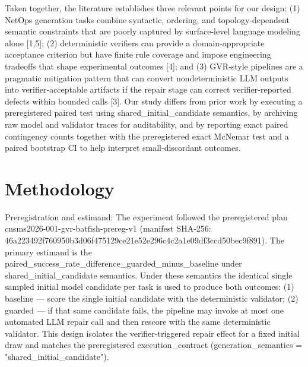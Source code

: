 \documentclass[conference]{IEEEtran}
\begin{document}
Taken together, the literature establishes three relevant points for our design: (1) NetOps generation tasks combine syntactic, ordering, and topology‑dependent semantic constraints that are poorly captured by surface‑level language modeling alone [1,5]; (2) deterministic verifiers can provide a domain‑appropriate acceptance criterion but have finite rule coverage and impose engineering tradeoffs that shape experimental outcomes [4]; and (3) GVR‑style pipelines are a pragmatic mitigation pattern that can convert nondeterministic LLM outputs into verifier‑acceptable artifacts if the repair stage can correct verifier‑reported defects within bounded calls [3]. Our study differs from prior work by executing a preregistered paired test using shared\_initial\_candidate semantics, by archiving raw model and validator traces for auditability, and by reporting exact paired contingency counts together with the preregistered exact McNemar test and a paired bootstrap CI to help interpret small‑discordant outcomes.

\section{Methodology}
Preregistration and estimand: The experiment followed the preregistered plan cnsms2026-001-gvr-batfish-prereg-v1 (manifest SHA‑256: 46a22349\allowbreak{}2f760950\allowbreak{}b3d06f47\allowbreak{}5129ce21\allowbreak{}e52e296c\allowbreak{}4c2a1e09\allowbreak{}df3ccd50\allowbreak{}bec9f891). The primary estimand is the paired\_success\_rate\_difference\_guarded\_minus\_baseline under shared\_initial\_candidate semantics. Under these semantics the identical single sampled initial model candidate per task is used to produce both outcomes: (1) baseline --- score the single initial candidate with the deterministic validator; (2) guarded --- if that same candidate fails, the pipeline may invoke at most one automated LLM repair call and then rescore with the same deterministic validator. This design isolates the verifier‑triggered repair effect for a fixed initial draw and matches the preregistered execution\_contract (generation\_semantics = "shared\_initial\_candidate").
\end{document}
